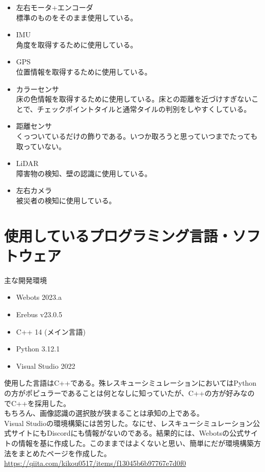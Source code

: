 \documentclass[dvipdfmx,a4paper]{jsarticle}
\begin{document}
    \begin{itemize}
      \item 左右モータ+エンコーダ\\標準のものをそのまま使用している。
      \item IMU\\角度を取得するために使用している。
      \item GPS\\位置情報を取得するために使用している。
      \item カラーセンサ\\床の色情報を取得するために使用している。床との距離を近づけすぎないことで、チェックポイントタイルと通常タイルの判別をしやすくしている。
      \item 距離センサ\\くっついているだけの飾りである。いつか取ろうと思っていつまでたっても取っていない。
      \item LiDAR\\障害物の検知、壁の認識に使用している。
      \item 左右カメラ\\被災者の検知に使用している。
    \end{itemize}
  

  \section{使用しているプログラミング言語・ソフトウェア}
  \noindent
  主な開発環境
  \begin{itemize}
    \item Webots 2023.a
    \item Erebus v23.0.5
    \item C++ 14 (メイン言語)
    \item Python 3.12.1
    \item Visual Studio 2022
  \end{itemize}

  使用した言語はC++である。殊レスキューシミュレーションにおいてはPythonの方がポピュラーであることは何となしに知っていたが、C++の方が好みなのでC++を採用した。\\
  もちろん、画像認識の選択肢が狭まることは承知の上である。\\

  Visual Studioの環境構築には苦労した。なにせ、レスキューシミュレーション公式サイトにもDiscordにも情報がないのである。結果的には、Webotsの公式サイトの情報を基に作成した。このままではよくないと思い、簡単にだが環境構築方法をまとめたページを作成した。\url{https://qiita.com/kikou0517/items/f13045b6b97767e7d0f0}\\
  
\end{document}
